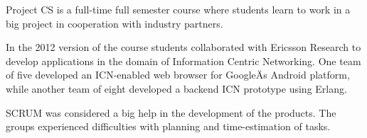 Project CS is a full-time full semester course where students learn to work in a big project in cooperation with industry partners.

In the 2012 version of the course students collaborated with Ericsson Research to develop applications in the domain of Information Centric Networking.  One team of five developed an ICN-enabled web browser for Google\"As Android  platform, while another team of eight developed a backend ICN prototype using Erlang.

SCRUM was considered a big help in the development of the products.
The groups experienced difficulties with planning and time-estimation of tasks.